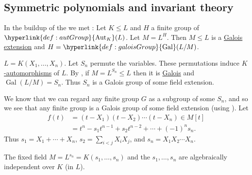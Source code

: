 \documentclass{article}
\DeclareMathOperator{\Aut}{Aut}
\DeclareMathOperator{\Gal}{Gal}
\begin{document}
\subsection{Symmetric polynomials and invariant theory}
In the buildup of the  we met :
Let $K \leq L$ and $H$ a finite group of $\hyperlink{def:autGroup}{\Aut_K}(L)$. Let $M = L^H$. Then $M \leq L$ is a \hyperlink{def:galoisExt}{Galois extension} and $H = \hyperlink{def:galoisGroup}{\Gal}(L/M)$.

\begin{eg}
    $L = K(X_1, \dotsc, X_n)$. Let $S_n$ permute the variables.
    These permutations induce \hyperlink{def:homo}{$K$-automorphisms} of $L$.
    By , if $M = L^{S_n} \leq L$ then it is \hyperlink{def:galoisExt}{Galois} and $\Gal(L/M) = S_n$.
    Thus $S_n$ is a Galois group of some field extension.

\end{eg}
We know that we can regard any finite group $G$ as a subgroup of some $S_n$, and so we see that any finite group is a Galois group of some field extension (using ).
Let
\begin{align*}
    f(t) &= (t-X_1)(t-X_2)\dotsm (t-X_n) \in M[t] \\
         &= t^n - s_1 t^{n-1} + s_2 t^{n-2} + \dotsb + (-1)^n s_n.
\end{align*}
Thus $s_1 = X_1 + \dotsb + X_n$, $s_2 = \sum_{i < j} X_i X_j$, and $s_n = X_1 X_2 \dotsm X_n$.
\begin{nthm}\label{thm:5.11}
    The fixed field $M = L^{s_n} = K(s_1, \dotsc, s_n)$ and the $s_1, \dotsc, s_n$ are algebraically independent over $K$ (in $L$).
\end{nthm}
\printindex
\end{document}
